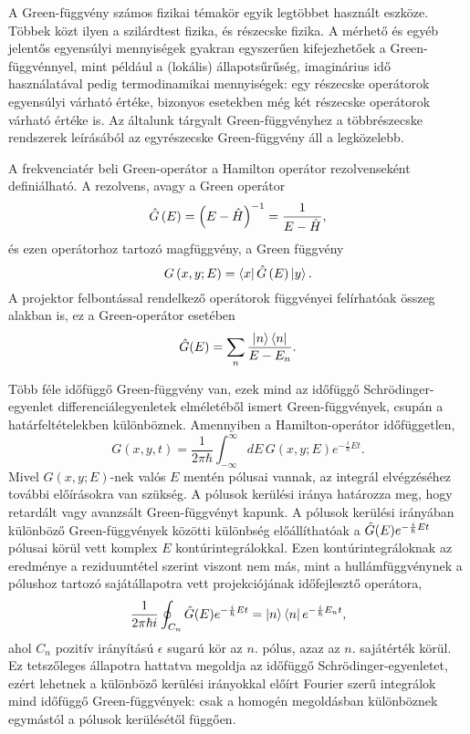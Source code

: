A Green-függvény számos fizikai témakör egyik legtöbbet használt eszköze. Többek közt ilyen a szilárdtest fizika, és részecske fizika. A mérhető és egyéb jelentős egyensúlyi mennyiségek gyakran egyszerűen kifejezhetőek a Green-függvénnyel, mint például a (lokális) állapotsűrűség, imaginárius idő használatával pedig termodinamikai mennyiségek: egy részecske operátorok egyensúlyi várható értéke, bizonyos esetekben még két részecske operátorok várható értéke is. Az általunk tárgyalt Green-függvényhez a többrészecske rendszerek leírásából az egyrészecske Green-függvény áll a legközelebb.

A frekvenciatér beli Green-operátor a Hamilton operátor rezolvenseként definiálható. A rezolvens, avagy a Green operátor
\begin{equation}
    \hat{G}\left( E \right) = \left(E-\hat{H}\right)^{-1} = \frac{1}{E-\hat{H}},
\end{equation}
és ezen operátorhoz tartozó magfüggvény, a Green függvény
\begin{equation}
    G\left( x, y; E \right) = \Bra{x}\hat{G}\left(E\right)\Ket{y}.
\end{equation}
A projektor felbontással rendelkező operátorok függvényei felírhatóak összeg alakban is, ez a Green-operátor esetében
\begin{equation}
	\hat{G}(E)=\sum_n \frac{\Ket{n}\Bra{n}}{E-E_n}.
	\label{green:greensum}
\end{equation}

Több féle időfüggő Green-függvény van, ezek mind az időfüggő Schrödinger-egyenlet differenciálegyenletek elméletéből ismert Green-függvények, csupán a határfeltételekben különböznek. Amennyiben a Hamilton-operátor időfüggetlen,
\begin{equation}
	G(x, y, t) = \frac{1}{2\pi\hbar}\int_{-\infty}^{\infty}dE\,G(x,y;E)e^{-\frac{i}{\hbar}Et}.
\end{equation}
Mivel $G(x,y;E)$-nek valós $E$ mentén pólusai vannak, az integrál elvégzéséhez további előírásokra van szükség. A pólusok kerülési iránya határozza meg, hogy retardált vagy avanzsált Green-függvényt kapunk. A pólusok kerülési irányában különböző Green-függvények közötti különbség előállíthatóak a $\hat{G}(E)e^{-\frac{i}{\hbar}Et}$ pólusai körül vett komplex $E$ kontúrintegrálokkal. Ezen kontúrintegráloknak az eredménye a reziduumtétel szerint viszont nem más, mint a hullámfüggvénynek a pólushoz tartozó sajátállapotra vett projekciójának időfejlesztő operátora,
\begin{equation}
	\frac{1}{2\pi\hbar i}\oint_{C_n}\hat{G}(E)e^{-\frac{i}{\hbar}Et}=\Ket{n}\Bra{n}e^{-\frac{i}{\hbar}E_nt},
	\label{green:residuum}
\end{equation}
ahol $C_n$ pozitív irányítású $\epsilon$ sugarú kör az $n$. pólus, azaz az $n$. sajátérték körül. Ez tetszőleges állapotra hattatva megoldja az időfüggő Schrödinger-egyenletet, ezért lehetnek a különböző kerülési irányokkal előírt Fourier szerű integrálok mind időfüggő Green-függvények: csak a homogén megoldásban különböznek egymástól a pólusok kerülésétől függően.

